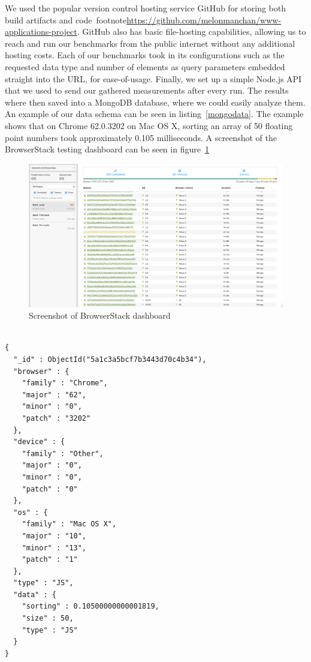 \documentclass[conference]{IEEEtran}
\begin{document}
We used the popular version control hosting service GitHub for storing both
build artifacts and code~footnote{\url{https://github.com/melonmanchan/www-applications-project}}. GitHub also has basic file-hosting capabilities,
allowing us to reach and run our benchmarks from the public internet without
any additional hosting costs. Each of our benchmarks took in its configurations
such as the requested data type and number of elements as query parameters
embedded straight into the URL, for ease-of-usage. Finally, we set up a simple
Node.js API that we used to send our gathered measurements after every run. The
results where then saved into a MongoDB database, where we could easily analyze
them. An example of our data schema can be seen in listing~\ref{mongodata}. The
example shows that on Chrome 62.0.3202 on Mac OS X, sorting an array of 50
floating point numbers took approximately 0.105 milliseconds. A screenshot of
the BrowserStack testing dashboard can be seen in figure~\ref{stackpic}

\begin{figure}[htbp]
\includegraphics[width=\linewidth,keepaspectratio]{stack.png}
  \caption{Screenshot of BrowserStack dashboard}\label{stackpic}
\end{figure}

\begin{lstlisting}[caption={Measurement data example},label=mongodata, basicstyle=\scriptsize]

{
  "_id" : ObjectId("5a1c3a5bcf7b3443d70c4b34"),
  "browser" : {
    "family" : "Chrome",
    "major" : "62",
    "minor" : "0",
    "patch" : "3202"
  },
  "device" : {
    "family" : "Other",
    "major" : "0",
    "minor" : "0",
    "patch" : "0"
  },
  "os" : {
    "family" : "Mac OS X",
    "major" : "10",
    "minor" : "13",
    "patch" : "1"
  },
  "type" : "JS",
  "data" : {
    "sorting" : 0.10500000000001819,
    "size" : 50,
    "type" : "JS"
  }
}
\end{lstlisting}
\end{document}
